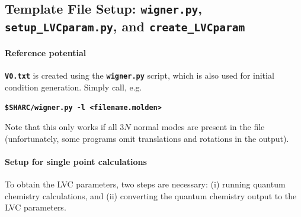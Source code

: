 \documentclass[a4paper,10pt,DIV=15,openany]{scrbook}
\newcommand{\ttt}[1]{\textbf{\texttt{#1}}}
\newenvironment{example}{
  \setlength{\OuterFrameSep}{3pt}
  \vspace{0mm}
  \definecolor{shadecolor}{HTML}{E4F4FF}
  \begin{shaded}
}{
  \end{shaded}
}
\begin{document}
\subsection{Template File Setup: \ttt{wigner.py}, \ttt{setup\_LVCparam.py}, and \ttt{create\_LVCparam}}\label{sec:setup_LVCparam.py}

\paragraph{Reference potential}

\ttt{V0.txt} is created using the \ttt{wigner.py} script, which is also used for initial condition generation. Simply call, e.g.
\begin{example}
\ttt{\$SHARC/wigner.py -l <filename.molden>}
\end{example}
Note that this only works if all $3N$ normal modes are present in the file (unfortunately, some programs omit translations and rotations in the output).

\paragraph{Setup for single point calculations}

To obtain the LVC parameters, two steps are necessary: (i) running quantum chemistry calculations, and (ii) converting the quantum chemistry output to the LVC parameters.
\end{document}
